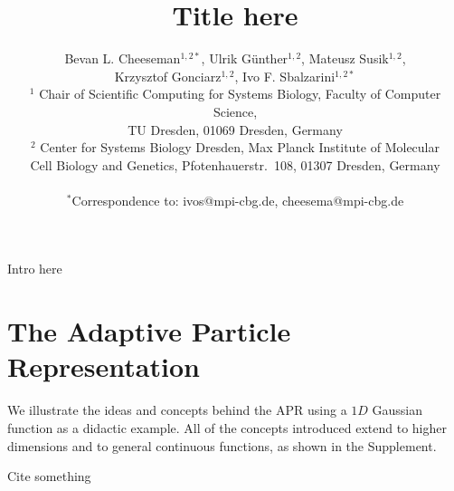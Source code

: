\documentclass[9pt,twocolumn]{article}
\title{Title here}
\author
{Bevan L. Cheeseman$^{1,2\ast}$, Ulrik G{\"u}nther$^{1,2}$, Mateusz Susik$^{1,2}$,\\ Krzysztof Gonciarz$^{1,2}$, Ivo F. Sbalzarini$^{1,2\ast}$
	\\
	\normalsize{$^{1}$ Chair of Scientific Computing for Systems Biology, Faculty of Computer Science,}\\
	\normalsize{TU Dresden, 01069 Dresden, Germany} \\
	\normalsize{$^{2}$ Center for Systems Biology Dresden, Max Planck Institute of Molecular }\\
	\normalsize{Cell Biology and Genetics, Pfotenhauerstr.~108, 01307 Dresden, Germany}\\
	\\
	\normalsize{$^\ast$Correspondence to: ivos@mpi-cbg.de, cheesema@mpi-cbg.de}
}
\date{}
\begin{document}
 
	
	
	
	
	
	
	Intro here
	
	\section*{The Adaptive Particle Representation}
	We illustrate the ideas and concepts behind the APR using a $1D$ Gaussian function as a didactic example. All of the concepts introduced extend to higher dimensions and to general continuous functions, as shown in the Supplement.
	
	Cite something	\cite{KartalKoc2015marsreview}
	

	
	
	
\end{document}

